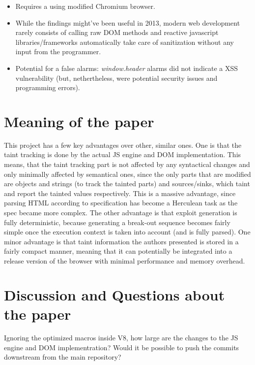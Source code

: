 \documentclass{article}
\begin{document}
\begin{itemize}
	\item Requires a using modified Chromium browser.

	\item While the findings might've been useful in 2013, modern web development rarely consists of calling raw DOM methods and reactive javascript libraries/frameworks automatically take care of sanitization without any input from the programmer.

	\item Potential for a false alarms: \textit{window.header} alarms did not indicate a XSS vulnerability (but, nethertheless, were potential security issues and programming errors).
\end{itemize}


\section{Meaning of the paper}

This project has a few key advantages over other, similar ones. One is that the taint tracking is done by the actual JS engine and DOM implementation. This means, that the taint tracking part is not affected by any syntactical changes and only minimally affected by semantical ones, since the only parts that are modified are objects and strings (to track the tainted parts) and sources/sinks, which taint and report the tainted values respectively. This is a massive advantage, since parsing HTML according to specification has become a Herculean task as the spec became more complex. The other advantage is that exploit generation is fully deterministic, because generating a break-out sequence becomes fairly simple once the execution context is taken into account (and is fully parsed). One minor advantage is that taint information the authors presented is stored in a fairly compact manner, meaning that it can potentially be integrated into a release version of the browser with minimal performance and memory overhead.


\section{Discussion and Questions about the paper}

Ignoring the optimized macros inside V8, how large are the changes to the JS engine and DOM implementration? Would it be possible to push the commits downstream from the main repository?
\end{document}
